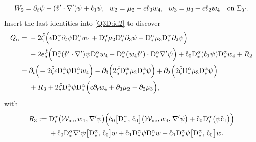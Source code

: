 \documentclass[twoside,11pt]{article}
\numberwithin{equation}{section}
\def\p{\partial}
\begin{document}
\begin{align}
	\nonumber
	W_2=\p_t\psi+(\mathring{v}'\cdot\nabla' )\psi+\mathring{\rm c}_1 \psi ,\ \
	w_2=\mu_2-\epsilon \mathring{v}_3 {w_4},\ \
		w_3=\mu_3+\epsilon \mathring{v}_2{w_4} \quad
		\textrm{on }\Sigma_T.
\end{align}
Insert the last identities into \eqref{Q3D:id2} to discover
\begin{align}\nonumber
	{Q}_{\alpha}=\;&
-2 \mathring{\zeta}  \Big(
\epsilon \mathrm{D}_*^{\alpha}\p_t\psi\mathrm{D}_*^{\alpha} {w_4}
+\mathrm{D}_*^{\alpha}	\mu_2 \mathrm{D}_*^{\alpha}  \p_3\psi
-\mathrm{D}_*^{\alpha}\mu_3\mathrm{D}_*^{\alpha} \p_2\psi
\Big)
 \\[0.5mm]
&
-2 \epsilon\mathring{\zeta}  \Big(
\mathrm{D}_*^{\alpha} (\mathring{v}'\cdot\nabla' )\psi\mathrm{D}_*^{\alpha} {w_4}
- \mathrm{D}_*^{\alpha}({w_4}	\mathring{v}'   ) \cdot \mathrm{D}_*^{\alpha}  \nabla' \psi
\Big)
+ \mathring{\rm c}_0  \mathrm{D}_*^{\alpha}(\mathring{\rm c}_1 \psi  )\mathrm{D}_*^{\alpha} w_4
+R_2
\nonumber\\[0.5mm]
\nonumber
=\;&\p_t \Big(\!-2 \mathring{\zeta}
\epsilon \mathrm{D}_*^{\alpha} \psi\mathrm{D}_*^{\alpha} {w_4} \Big)
-\p_3\Big(2\mathring{\zeta}   \mathrm{D}_*^{\alpha}	\mu_2 \mathrm{D}_*^{\alpha}   \psi   \Big)
+ \p_2\Big(2\mathring{\zeta} \mathrm{D}_*^{\alpha}\mu_3\mathrm{D}_*^{\alpha}\psi  \Big)\\[0.5mm]
&+R_3
+2\mathring{\zeta}  \mathrm{D}_*^{\alpha}\psi\mathrm{D}_*^{\alpha}\Big(\epsilon \p_t {w_4}+\p_3\mu_2-\p_2\mu_3\Big),
\label{Q3D:id3}
\end{align}	
with
	\begin{align}
		R_3:=\;&	\mathrm{D}_*^{\alpha}\big(\mathcal{W}_{\rm nc},w_4,\nabla'\psi \big)
		\Big(\mathring{\rm c}_0\big[\mathrm{D}_*^{\alpha},\,\mathring{\rm c}_0\big]
		\big(\mathcal{W}_{\rm nc},w_4,\nabla'\psi\big)
		+\mathring{\rm c}_0\mathrm{D}_*^{\alpha}\big(\psi \mathring{\rm c}_1\big)
		\Big) \nonumber\\[0.5mm]
\label{R3:def}
&
+\mathring{\rm c}_0 \mathrm{D}_*^{\alpha} \nabla'\psi \big[\mathrm{D}_*^{\alpha},\,\mathring{\rm c}_0\big] w
+\mathring{\rm c}_1 \mathrm{D}_*^{\alpha}\psi \mathrm{D}_*^{\alpha}w
+\mathring{\rm c}_1 \mathrm{D}_*^{\alpha}\psi \big[\mathrm{D}_*^{\alpha},\,\mathring{\rm c}_0\big]w .
\end{align}
\end{document}
